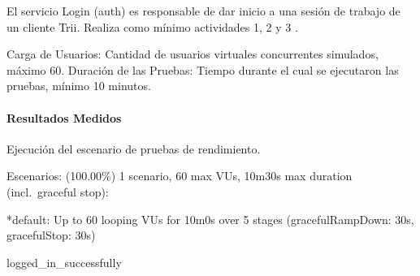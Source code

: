 \documentclass[
  paper=a4,
  ,captions=tableheading
]{scrartcl}
\renewenvironment{quote}{\begin{customblockquote}\list{}{\rightmargin=0em\leftmargin=0em}%
\item\relax\color{blockquote-text}\ignorespaces}{\unskip\unskip\endlist\end{customblockquote}}
\begin{document}
El servicio Login (auth) es responsable de dar inicio a una sesión de
trabajo de un cliente Trii. Realiza como mínimo actividades 1, 2 y 3 .

Carga de Usuarios: Cantidad de usuarios virtuales concurrentes
simulados, máximo 60. Duración de las Pruebas: Tiempo durante el cual se
ejecutaron las pruebas, mínimo 10 minutos.

\paragraph{Resultados Medidos}\label{sec:resultados-medidos-1}

Ejecución del escenario de pruebas de rendimiento.

\begin{quote}
Escenarios: (100.00\%) 1 scenario, 60 max VUs, 10m30s max duration
(incl.~graceful stop):

*default: Up to 60 looping VUs for 10m0s over 5 stages
(gracefulRampDown: 30s, gracefulStop: 30s)

logged\_in\_successfully
\end{quote}
\end{document}

